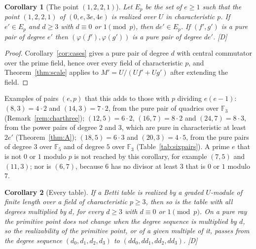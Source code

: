 \documentclass[11pt]{article}
\newtheorem{corollary}{Corollary}
\theoremstyle{definition}
\theoremstyle{remark}
\newcommand{\F}{\mathbb{F}}
\begin{document}
\begin{corollary}[The point $(1,2,2,1)$]\label{cor:scale1}
Let $E_p$ be the set of $e\ge1$ such that the point $(1,2,2,1)$ of $(0,e,3e,4e)$ is realized over $U$ in characteristic $p$. If $e'\in E_p$ and $d\ge3$ with $d\equiv0$ or $1\pmod p$, then $de'\in E_p$. If $(f',g')$ is a pure pair of degree $e'$ then $(\varphi(f'),\varphi(g'))$ is a pure pair of degree $de'$. [D]
\end{corollary}
\begin{proof}
Corollary~\ref{cor:cases} gives a pure pair of degree $d$ with central commutator over the prime field, hence over every field of characteristic $p$, and Theorem~\ref{thm:scale} applies to $M'=U/(Uf'+Ug')$ after extending the field.
\end{proof}
Examples of pairs $(e,p)$ that this adds to those with $p$ dividing $e(e-1)$: $(8,3)=4\cdot2$ and $(14,3)=7\cdot2$, from the pure pair of quadrics over $\F_3$ (Remark~\ref{rem:charthree}); $(12,5)=6\cdot2$, $(16,7)=8\cdot2$ and $(24,7)=8\cdot3$, from the power pairs of degree $2$ and $3$, which are pure in characteristic at least $2e'$ (Theorem~\ref{thm:A}); $(18,5)=6\cdot3$ and $(20,3)=4\cdot5$, from the pure pairs of degree $3$ over $\F_5$ and of degree $5$ over $\F_3$ (Table~\ref{tab:sixpairs}). A prime $e$ that is not $0$ or $1$ modulo $p$ is not reached by this corollary, for example $(7,5)$ and $(11,3)$; nor is $(6,7)$, because $6$ has no divisor at least $3$ that is $0$ or $1$ modulo $7$.

\begin{corollary}[Every table]\label{cor:scale2}
If a Betti table is realized by a graded $U$-module of finite length over a field of characteristic $p\ge3$, then so is the table with all degrees multiplied by $d$, for every $d\ge3$ with $d\equiv0$ or $1\pmod p$. On a pure ray the primitive point does not change when the degree sequence is multiplied by $d$, so the realizability of the primitive point, or of a given multiple of it, passes from the degree sequence $(d_0,d_1,d_2,d_3)$ to $(dd_0,dd_1,dd_2,dd_3)$. [D]
\end{corollary}
\end{document}
